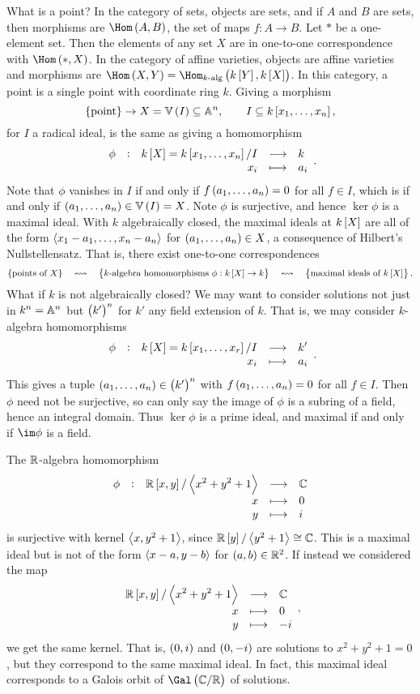 What is a point? In the category of sets, objects are sets, and if $ A $ and $ B $ are sets, then morphisms are $ \Hom\br{A, B} $, the set of maps $ f : A \to B $. Let $ * $ be a one-element set. Then the elements of any set $ X $ are in one-to-one correspondence with $ \Hom\br{*, X} $. In the category of affine varieties, objects are affine varieties and morphisms are $ \Hom\br{X, Y} = \Hom_{\text{$ k $-alg}}\br{k\sbr{Y}, k\sbr{X}} $. In this category, a point is a single point with coordinate ring $ k $. Giving a morphism
$$ \cbr{\text{point}} \to X = \VV\br{I} \subseteq \AA^n, \qquad I \subseteq k\sbr{x_1, \dots, x_n}, $$
for $ I $ a radical ideal, is the same as giving a homomorphism
$$ \function[\phi]{k\sbr{X} = k\sbr{x_1, \dots, x_n} / I}{k}{x_i}{a_i}. $$
Note that $ \phi $ vanishes in $ I $ if and only if $ f\br{a_1, \dots, a_n} = 0 $ for all $ f \in I $, which is if and only if $ \br{a_1, \dots, a_n} \in \VV\br{I} = X $. Note $ \phi $ is surjective, and hence $ \ker \phi $ is a maximal ideal. With $ k $ algebraically closed, the maximal ideals at $ k\sbr{X} $ are all of the form $ \abr{x_1 - a_1, \dots, x_n - a_n} $ for $ \br{a_1, \dots, a_n} \in X $, a consequence of Hilbert's Nullstellensatz. That is, there exist one-to-one correspondences
$$ \cbr{\text{points of} \ X} \quad \leftrightsquigarrow \quad \cbr{\text{$ k $-algebra homomorphisms} \ \phi : k\sbr{X} \to k} \quad \leftrightsquigarrow \quad \cbr{\text{maximal ideals of} \ k\sbr{X}}. $$
What if $ k $ is not algebraically closed? We may want to consider solutions not just in $ k^n = \AA^n $ but $ \br{k'}^n $ for $ k' $ any field extension of $ k $. That is, we may consider $ k $-algebra homomorphisms
$$ \function[\phi]{k\sbr{X} = k\sbr{x_1, \dots, x_r} / I}{k'}{x_i}{a_i}. $$
This gives a tuple $ \br{a_1, \dots, a_n} \in \br{k'}^n $ with $ f\br{a_1, \dots, a_n} = 0 $ for all $ f \in I $. Then $ \phi $ need not be surjective, so can only say the image of $ \phi $ is a subring of a field, hence an integral domain. Thus $ \ker \phi $ is a prime ideal, and maximal if and only if $ \im \phi $ is a field.

\begin{example*}
The $ \RR $-algebra homomorphism
$$ \functions[\phi]{\RR\sbr{x, y} / \abr{x^2 + y^2 + 1}}{\CC}{x}{0}{y}{i} $$
is surjective with kernel $ \abr{x, y^2 + 1} $, since $ \RR\sbr{y} / \abr{y^2 + 1} \cong \CC $. This is a maximal ideal but is not of the form $ \abr{x - a, y - b} $ for $ \br{a, b} \in \RR^2 $. If instead we considered the map
$$ \functions{\RR\sbr{x, y} / \abr{x^2 + y^2 + 1}}{\CC}{x}{0}{y}{-i}, $$
we get the same kernel. That is, $ \br{0, i} $ and $ \br{0, -i} $ are solutions to $ x^2 + y^2 + 1 = 0 $, but they correspond to the same maximal ideal. In fact, this maximal ideal corresponds to a Galois orbit of $ \Gal\br{\CC / \RR} $ of solutions.
\end{example*}

